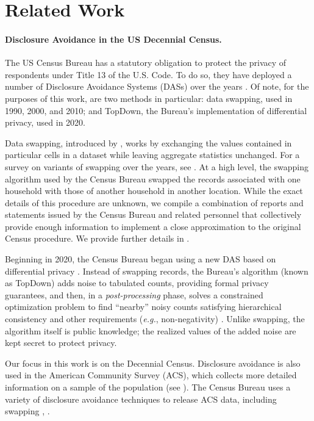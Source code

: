 \section{Related Work}
\label{sec:related}
\paragraph*{Disclosure Avoidance in the US Decennial Census.}

The US Census Bureau has a statutory obligation to protect the privacy of respondents under Title 13 of the U.S. Code.
To do so, they have deployed a number of Disclosure Avoidance Systems (DASs) over the years \citep{mckenna-rmd}.
Of note, for the purposes of this work, are two methods in particular: data swapping, used in 1990, 2000, and 2010; and TopDown, the Bureau's implementation of differential privacy, used in 2020.

Data swapping, introduced by \citet{dalenius1982data}, works by exchanging the values contained in particular cells in a dataset while leaving aggregate statistics unchanged.
For a survey on variants of swapping over the years, see \citet{fienberg2004data}.
At a high level, the swapping algorithm used by the Census Bureau swapped the records associated with one household with those of another household in another location.
While the exact details of this procedure are unknown, we compile a combination of reports and statements issued by the Census Bureau and related personnel \citep{abowd-declaration,griffin1989disclosure,mckenna-rmd,ramanayake2010balancing,steel-zayatz,wright2021empirical,zayatz-sdc,zayatz-jos,zayatz-2010,hawala2003microdata} that collectively provide enough information to implement a close approximation to the original Census procedure.
We provide further details in .

Beginning in 2020, the Census Bureau began using a new DAS based on differential privacy \citep{dwork2006calibrating,abowd2018us}.
Instead of swapping records, the Bureau's algorithm (known as TopDown) adds noise to tabulated counts, providing formal privacy guarantees, and then, in a {\em post-processing} phase, solves a constrained optimization problem to find ``nearby'' noisy counts satisfying hierarchical consistency and other requirements (\textit{e.g.}, non-negativity) \citep{abowd2019census}. 
Unlike swapping, the algorithm itself is public knowledge; the realized values of the added noise are kept secret to protect privacy.

Our focus in this work is on the Decennial Census.
Disclosure avoidance is also used in the American Community Survey (ACS), which collects more detailed information on a sample of the population (see \citet{zayatz-2010}).
The Census Bureau uses a variety of disclosure avoidance techniques to release
ACS data, including swapping \citep[Section 13.8]{acs_design}, \citep{pums_accuracy,rodriguez_acm}.

